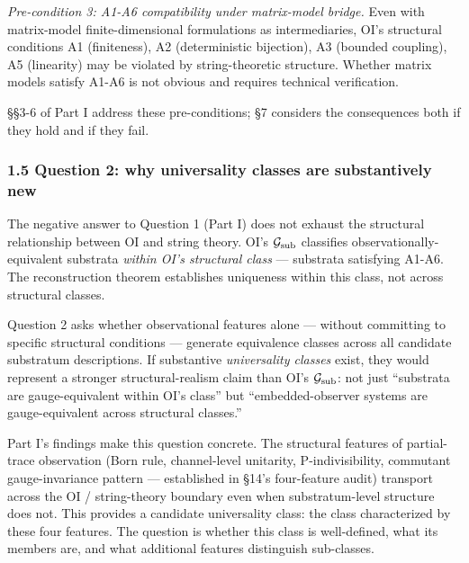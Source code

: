 \documentclass[
]{article}
\begin{document}
\emph{Pre-condition 3: A1-A6 compatibility under matrix-model bridge.}
Even with matrix-model finite-dimensional formulations as
intermediaries, OI's structural conditions A1 (finiteness), A2
(deterministic bijection), A3 (bounded coupling), A5 (linearity) may be
violated by string-theoretic structure. Whether matrix models satisfy
A1-A6 is not obvious and requires technical verification.

§§3-6 of Part I address these pre-conditions; §7 considers the
consequences both if they hold and if they fail.

\hypertarget{question-2-why-universality-classes-are-substantively-new}{%
\subsubsection{1.5 Question 2: why universality classes are
substantively
new}\label{question-2-why-universality-classes-are-substantively-new}}

The negative answer to Question 1 (Part I) does not exhaust the
structural relationship between OI and string theory. OI's
\(\mathcal{G}_{\rm sub}\) classifies observationally-equivalent
substrata \emph{within OI's structural class} --- substrata satisfying
A1-A6. The reconstruction theorem establishes uniqueness within this
class, not across structural classes.

Question 2 asks whether observational features alone --- without
committing to specific structural conditions --- generate equivalence
classes across all candidate substratum descriptions. If substantive
\emph{universality classes} exist, they would represent a stronger
structural-realism claim than OI's \(\mathcal{G}_{\rm sub}\): not just
``substrata are gauge-equivalent within OI's class'' but
``embedded-observer systems are gauge-equivalent across structural
classes.''

Part I's findings make this question concrete. The structural features
of partial-trace observation (Born rule, channel-level unitarity,
P-indivisibility, commutant gauge-invariance pattern --- established in
§14's four-feature audit) transport across the OI / string-theory
boundary even when substratum-level structure does not. This provides a
candidate universality class: the class characterized by these four
features. The question is whether this class is well-defined, what its
members are, and what additional features distinguish sub-classes.
\end{document}
